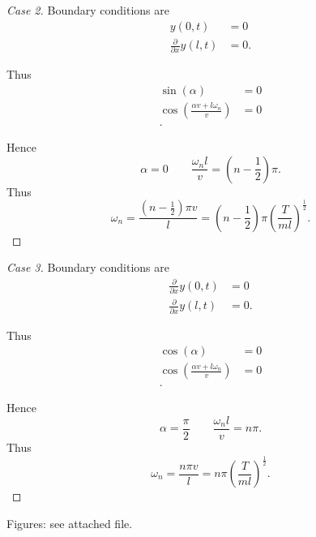 \begin{proof}[Case 2]
	Boundary conditions are
	\begin{align*}
		y(0, t) &= 0 \\
		\frac{\partial }{\partial x} y(l, t) &= 0
	.\end{align*}

	Thus
	\begin{align*}
		\sin(\alpha) &=  0\\
		\cos \left(\frac{\alpha v+l \omega_n}{v}\right)&= 0 \\
	.\end{align*} 

	Hence
	\[
		\alpha = 0 \qquad \frac{\omega_n l}{v} = (n - \frac{1}{2}) \pi
	.\] 
	Thus
	\[
		\omega_n = \frac{(n-\frac{1}{2}) \pi v}{l} = (n-\frac{1}{2}) \pi \left( \frac{T}{m l} \right) ^{\frac{1}{2}}
	.\] 


\end{proof}
\begin{proof}[Case 3]
	Boundary conditions are
	\begin{align*}
		\frac{\partial }{\partial x} y(0, t) &= 0\\
		\frac{\partial }{\partial x} y(l, t) &= 0
	.\end{align*}

	Thus
	\begin{align*}
		\cos(\alpha) &=  0\\
		\cos \left(\frac{\alpha v+l \omega_n}{v}\right)&= 0 \\
	.\end{align*} 

	Hence
	\[
		\alpha = \frac{\pi}{2} \qquad \frac{\omega_n l}{v} = n  \pi
	.\] 
	Thus
	\[
		\omega_n = \frac{n \pi v}{l} = n \pi \left( \frac{T}{m l} \right) ^{\frac{1}{2}}
	.\] 


\end{proof}

Figures: see attached file.
